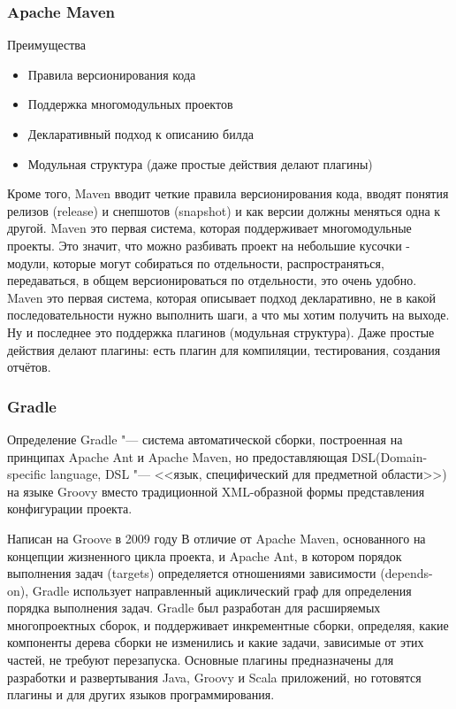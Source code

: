 \documentclass{../industrial-development}
\begin{document}
\begin{frame} \frametitle{Apache Maven}
	\begin{block}{Преимущества}
		\begin{itemize}
			\item Правила версионирования кода
			\item Поддержка многомодульных проектов
			\item Декларативный подход к описанию билда
			\item Модульная структура (даже простые действия
			делают плагины)
		\end{itemize}
	\end{block}	
\end{frame}
\lecturenotes
Кроме того, Maven вводит четкие правила версионирования кода, вводят понятия релизов (release) и снепшотов (snapshot) и как версии должны меняться одна к другой.
Maven это первая система, которая поддерживает многомодульные проекты. Это значит, что можно разбивать проект на небольшие кусочки - модули, которые могут собираться по отдельности, распространяться, передаваться, в общем версионироваться по отдельности, это очень удобно.
Maven это первая система, которая описывает подход декларативно, не в какой последовательности нужно выполнить шаги, а что мы хотим получить на выходе.
Ну и последнее это поддержка плагинов (модульная структура). Даже простые действия делают плагины: есть плагин для компиляции, тестирования, создания отчётов.
~\cite{Yandex_Build_Automation}

\begin{frame} \frametitle{Gradle}
	\begin{block}{Определение}
		Gradle "--- система автоматической сборки, построенная на принципах Apache Ant и Apache Maven, но предоставляющая DSL(Domain-specific language, DSL "--- <<язык, специфический для предметной области>>) на языке Groovy вместо традиционной XML-образной формы представления конфигурации проекта.
	\end{block}
\end{frame}

\lecturenotes
	Написан на Groove в 2009 году
	В отличие от Apache Maven, основанного на концепции жизненного цикла проекта, и Apache Ant, в котором порядок выполнения задач (targets) определяется отношениями зависимости (depends-on), Gradle использует направленный ациклический граф для определения порядка выполнения задач.
	Gradle был разработан для расширяемых многопроектных сборок, и поддерживает инкрементные сборки, определяя, какие компоненты дерева сборки не изменились и какие задачи, зависимые от этих частей, не требуют перезапуска.
	Основные плагины предназначены для разработки и развертывания Java, Groovy и Scala приложений, но готовятся плагины и для других языков программирования.
~\cite{Wiki_Gradle}
~\cite{Yandex_Build_Automation}
	
\end{document}
